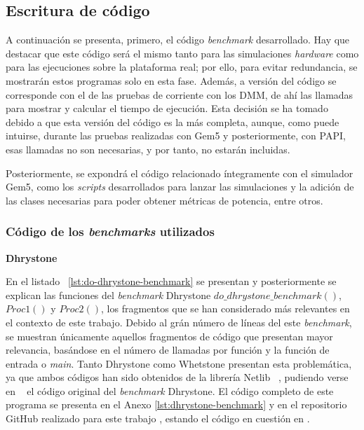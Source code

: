 \subsection{Escritura de código}
\label{subs:mostrandoCodigoGem5}

A continuación se presenta, primero, el código \textit{benchmark} desarrollado. Hay que destacar que este código será el mismo tanto para las simulaciones \textit{hardware} como para las ejecuciones sobre la plataforma real; por ello, para evitar redundancia, se mostrarán estos programas solo en esta fase. Además, a versión del código se corresponde con el de las pruebas de corriente con los \ac{DMM}, de ahí las llamadas para mostrar y calcular el tiempo de ejecución. Esta decisión se ha tomado debido a que esta versión del código es la más completa, aunque, como puede intuirse, durante las pruebas realizadas con Gem5 y posteriormente, con \ac{PAPI}, esas llamadas no son necesarias, y por tanto, no estarán incluidas.

Posteriormente, se expondrá el código relacionado íntegramente con el simulador Gem5, como los \textit{scripts} desarrollados para lanzar las simulaciones y la adición de las clases necesarias para poder obtener métricas de potencia, entre otros. 

\subsubsection{Código de los \textit{benchmarks} utilizados }

\par{\textbf{Dhrystone}}

\par{En el listado ~\ref{lst:do-dhrystone-benchmark} se presentan y posteriormente se explican las funciones del \textit{benchmark} Dhrystone $do\_dhrystone\_benchmark()$, $Proc1()$ y $Proc2()$, los fragmentos que se han considerado más relevantes en el contexto de este trabajo. Debido al grán número de líneas del este \textit{benchmark}, se muestran únicamente aquellos fragmentos de código que presentan mayor relevancia, basándose en el número de llamadas por función y la función de entrada o \textit{main}. Tanto Dhrystone como Whetstone presentan esta problemática, ya que ambos códigos han sido obtenidos de la librería Netlib ~\cite{netlib-library}, pudiendo verse en ~\cite[text]{dhrystone-code} el código original del \textit{benchmark} Dhrystone. El código completo de este programa se presenta en el Anexo \ref{lst:dhrystone-benchmark} y en el repositorio GitHub realizado para este trabajo \cite{repoTFM}, estando el código en cuestión en \cite{repoTFM-dhrystone}}.

